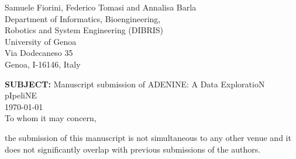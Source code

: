 \documentclass[11pt]{letter} %
\begin{document}

\begin{letter}

\begin{center}
\large Samuele Fiorini, Federico Tomasi and Annalisa Barla \\ %
\vspace{10pt} %
Department of Informatics, Bioengineering, \\Robotics and System Engineering (DIBRIS)\\
University of Genoa\\
Via Dodecaneso 35\\
Genoa, I-16146, Italy
\end{center}
\vfill

\signature{Samuele Fiorini\\Federico Tomasi\\Annalisa Barla} %


{\bf SUBJECT:} Manuscript submission of {\sc ADENINE: A Data ExploratioN pIpeliNE}\vspace{10pt}\\
\vspace{10pt}\today\\
\vspace{10pt}
To whom it may concern,

the submission of this manuscript is not simultaneous to any other venue and it does not significantly overlap with previous submissions of the authors.


\end{letter}
\end{document}

